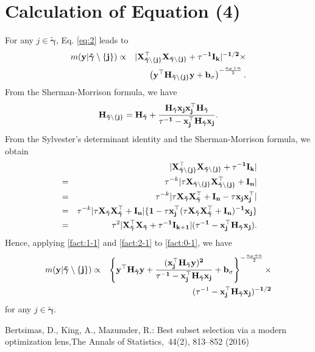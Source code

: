 \documentclass[twocolumn]{svjour3}       %
\newcommand{\T}{\top} %
\newcommand{\uI}{\bf I} %
\newcommand{\uH}{\bf H} %
\newcommand{\uX}{\bf X} %
\newcommand{\ux}{\bf x} %
\newcommand{\uy}{\bf y} %
\newcommand{\0}{\boldsymbol 0} %
\newcommand{\1}{\boldsymbol 1} %
\newcommand{\bg}{\boldsymbol \gamma} %
\begin{document}
{\section{Calculation of Equation (4)}\label{app:2}
For any $j \in \tilde{\bg}$, Eq. \eqref{eq:2} leads to
\begin{eqnarray} \label{fact:0-1}
m(\uy|\tilde{\bg}\setminus\{j\})&\propto& |\uX_{\tilde{\bg}\setminus\{j\} }^{\T}\uX_{\tilde{\bg}\setminus\{j\}}+\tau^{-1}\uI_{k} |^{-1/2}\times\nonumber\\  
&&\left(\uy^{\T}\uH_{\tilde{\bg}\setminus\{j\}}\uy+b_{\sigma}\right)^{-\frac{a_{\sigma}+n}{2} }.
\end{eqnarray}
From the Sherman-Morrison formula, we have
\begin{eqnarray}\label{fact:1-1}
\uH_{\tilde{\bg}\setminus\{j\} }= \uH_{\tilde{\bg}}+\frac{\uH_{\tilde{\bg}}\ux_j \ux_j
  ^{\T}\uH_{\tilde{\bg}} } {\tau^{-1}-\ux_j^{\T}\uH_{\tilde{\bg}}\ux_j}.
\end{eqnarray}
From the Sylvester's determinant identity and the Sherman-Morrison formula, we obtain 
\begin{eqnarray}\label{fact:2-1}
&&|\uX_{\tilde{\bg}\setminus\{j\}}^{\T}\uX_{\tilde{\bg}\setminus\{j\} }+\tau^{-1}\uI_{k}   | \\
&=& \tau^{-k}|\tau \uX_{\tilde{\bg}\setminus\{j\} }\uX_{\tilde{\bg}\setminus\{j\} }^{\T}+\uI_n |\nonumber\\
  &=& \tau^{-k}|\tau \uX_{\tilde{\bg}}\uX_{\tilde{\bg}}^{\T}+\uI_n-\tau \ux_j \ux_j^{\T} |\nonumber\\
  &=&  \tau^{-k} |\tau \uX_{\tilde{\bg}}\uX_{\tilde{\bg}}^{\T}+\uI_n| \{1- \tau \ux_j^{\T}
  (\tau \uX_{\tilde{\bg}}\uX_{\tilde{\bg}}^{\T}+\uI_n)^{-1}\ux_j\}\nonumber\\
  &=&\tau^2 | \uX_{\tilde{\bg}}^{\T}\uX_{\tilde{\bg}}+\tau^{-1}\uI_{k+1}| (\tau^{-1}-\ux_j^{\T}\uH_{\tilde{\bg}} \ux_j).
\end{eqnarray}
Hence, applying \eqref{fact:1-1} and \eqref{fact:2-1} to \eqref{fact:0-1}, we have
\begin{eqnarray*}
m(\uy|\tilde{\bg}\setminus \{j\})  &\propto& \left\{\uy^{\T}\uH_{\tilde{\bg}}\uy+\frac{(
  \ux_j^{\T}\uH_{\tilde{\bg}}\uy)^2}{\tau^{-1}-\ux_j^{\T}\uH_{\tilde{\bg}} \ux_j }+b_{\sigma}\right\}^
 {-\frac{a_{\sigma}+n}{2}}\times\\
 &&(\tau^{-1}-\ux_j^{\T}\uH_{\tilde{\bg}} \ux_j)^{-1/2}
\end{eqnarray*}
for any $j \in \tilde{\bg}$.
\begin{thebibliography}{00}
%
%
Bertsimas, D., King, A., Mazumder, R.: Best subset selection via a modern optimization lens,The Annals of Statistics,~{44(2)}, 813--852 (2016)


\end{thebibliography}}
\end{document}
